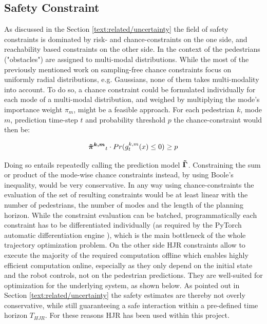 \subsection{Safety Constraint}
\label{text:approach/constraint/safety}
As discussed in the Section \ref{text:related/uncertainty} the field of safety constraints is dominated by risk- and chance-constraints on the one side, and reachability based constraints on the other side. 
\newline
In the context of \project the pedestrians ("obstacles") are assigned to multi-modal distributions. While the most of the previously mentioned work on sampling-free chance constraints focus on uniformly radial distributions, e.g. Gaussians, none of them takes multi-modality into account. To do so, a chance constraint could be formulated individually for each mode of a multi-modal distribution, and weighed by multiplying the mode's importance weight $\pi_m$, might be a feasible approach. For each pedestrian $k$, mode $m$, prediction time-step $t$ and probability threshold $p$ the chance-constraint would then be:

\begin{equation}
\piped[k,m]_t \cdot Pr(g_t^{k,m}(x)\leq 0) \geq p
\end{equation}

Doing so entails repeatedly calling the prediction model $\distmodel[]$. Constraining the sum or product of the mode-wise chance constraints instead, by using Boole's inequality, would be very conservative. In any way using chance-constraints the evaluation of the set of resulting constraints would be at least linear with the number of pedestrians, the number of modes and the length of the planning horizon. While the constraint evaluation can be batched, programmatically each constraint has to be differentiated individually (as required by the PyTorch automatic differentiation engine \cite{pytorch}), which is the main bottleneck of the whole trajectory optimization problem. 
\newline
On the other side \ac{HJR} constraints allow to execute the majority of the required computation offline which enables highly efficient computation online, especially as they only depend on the initial state and the robot controls, not on the pedestrian predictions. They are well-suited for optimization for the underlying system, as shown below. As pointed out in Section \ref{text:related/uncertainty} the safety estimates are thereby not overly conservative, while still guaranteeing a safe interaction within a pre-defined time horizon $T_{HJR}$. For these reasons \ac{HJR} has been used within this project.

